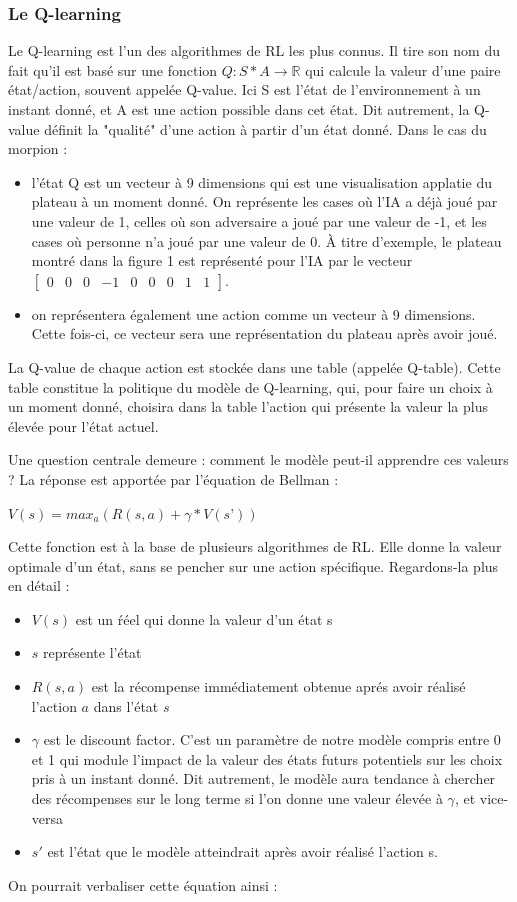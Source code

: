 \documentclass[french]{article}
\begin{document}
    \subsubsection{Le Q-learning}
    Le Q-learning est l'un des algorithmes de RL les plus connus. Il tire son nom du fait qu'il est basé sur une fonction $Q:S * A \rightarrow \mathbb{R}$ qui calcule la valeur d'une paire état/action, souvent appelée Q-value. Ici S est l'état de l'environnement à un instant donné, et A est une action possible dans cet état. Dit autrement, la Q-value définit la "qualité" d'une action à partir d'un état donné. Dans le cas du morpion :
    \begin{itemize}
        \item l'état Q est un vecteur à 9 dimensions qui est une visualisation applatie du plateau à un moment donné. On représente les cases où l'IA a déjà joué par une valeur de 1, celles où son adversaire a joué par une valeur de -1, et les cases où personne n'a joué par une valeur de 0. À titre d'exemple, le plateau montré dans la figure 1 est représenté pour l'IA par le vecteur $\begin{bmatrix}0&0&0&-1&0&0&0&1&1\end{bmatrix}$.
        \item on représentera également une action comme un vecteur à 9 dimensions. Cette fois-ci, ce vecteur sera une représentation du plateau après avoir joué.
    \end{itemize}

    La Q-value de chaque action est stockée dans une table (appelée Q-table). Cette table constitue la politique du modèle de Q-learning, qui, pour faire un choix à un moment donné, choisira dans la table l'action qui présente la valeur la plus élevée pour l'état actuel.

    Une question centrale demeure : comment le modèle peut-il apprendre ces valeurs ? La réponse est apportée par l'équation de Bellman :


    {\centering $V(s)=max_a(R(s,a)+ \gamma*V(s’))$}
    

    Cette fonction est à la base de plusieurs algorithmes de RL. Elle donne la valeur optimale d'un état, sans se pencher sur une action spécifique. Regardons-la plus en détail :
    \begin{itemize}
        \item $V(s)$ est un ŕéel qui donne la valeur d'un état s
        \item $s$ représente l'état
        \item $R(s, a)$ est la récompense immédiatement obtenue aprés avoir réalisé l'action $a$ dans l'état $s$
        \item $\gamma$ est le discount factor. C'est un paramètre de notre modèle compris entre 0 et 1 qui module l'impact de la valeur des états futurs potentiels sur les choix pris à un instant donné. Dit autrement, le modèle aura tendance à chercher des récompenses sur le long terme si l'on donne une valeur élevée à $\gamma$, et vice-versa
        \item $s'$ est l'état que le modèle atteindrait après avoir réalisé l'action s.
    \end{itemize}
    On pourrait verbaliser cette équation ainsi :
\end{document}
